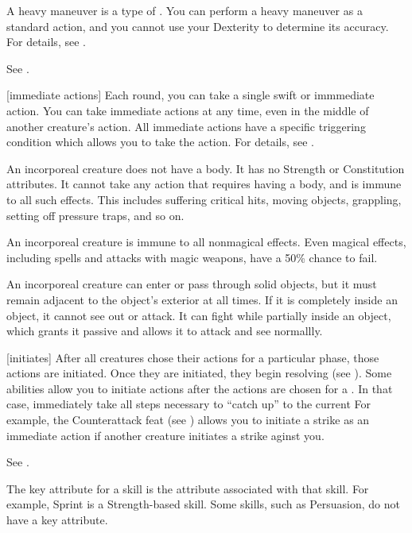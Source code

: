  A heavy maneuver is a type of .
You can perform a heavy maneuver as a standard action, and you cannot use your Dexterity to determine its accuracy.
For details, see .

 See .

[immediate actions] Each round, you can take a single swift or immmediate action.
You can take immediate actions at any time, even in the middle of another creature's action.
All immediate actions have a specific triggering condition which allows you to take the action.
For details, see .

 An incorporeal creature does not have a body.
It has no Strength or Constitution attributes.
It cannot take any action that requires having a body, and is immune to all such effects.
This includes suffering critical hits, moving objects, grappling, setting off pressure traps, and so on.

An incorporeal creature is immune to all nonmagical effects.
Even magical effects, including spells and attacks with magic weapons, have a 50\% chance to fail.

An incorporeal creature can enter or pass through solid objects, but it must remain adjacent to the object's exterior at all times.
If it is completely inside an object, it cannot see out or attack.
It can fight while partially inside an object, which grants it passive  and allows it to attack and see normallly.

[initiates] After all creatures chose their actions for a particular phase, those actions are initiated.
Once they are initiated, they begin resolving (see ).
Some abilities allow you to initiate actions after the actions are chosen for a .
In that case, immediately take all steps necessary to ``catch up'' to the current 
For example, the Counterattack feat (see ) allows you to initiate a strike as an immediate action if another creature initiates a strike aginst you.

 See .

 The key attribute for a skill is the attribute associated with that skill.
For example, Sprint is a Strength-based skill.
Some skills, such as Persuasion, do not have a key attribute.

